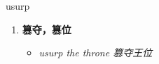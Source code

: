 
\begin{frame}
{\huge usurp}
\begin{center}
\begin{enumerate}\Large
  \item \textbf{篡夺，篡位}
  \begin{itemize}
    \item \em{\Large{usurp the throne 篡夺王位}}
  \end{itemize}
\end{enumerate}
\end{center}
\end{frame}
